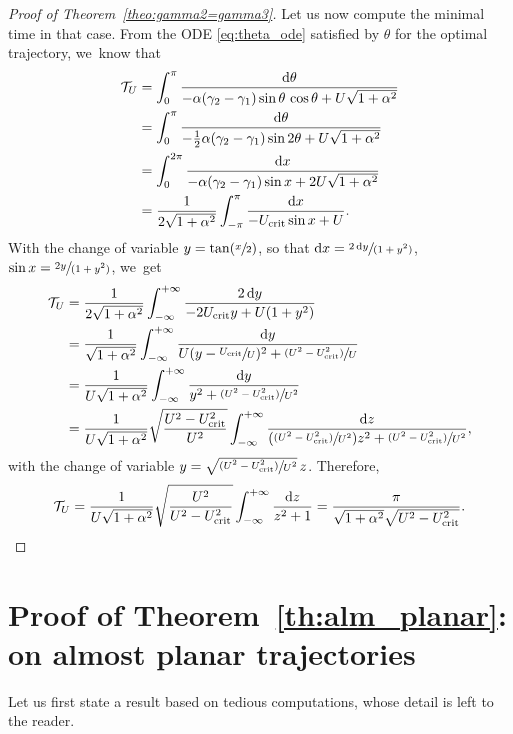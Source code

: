 \documentclass[10pt]{amsart}
\newcommand{\psfrac}[2]{\sfrac{(#1)}{#2}}
\newcommand{\spfrac}[2]{\sfrac{#1}{(#2)}}
\newcommand{\Psfrac}[2]{(\sfrac{#1}{#2})}
\newcommand{\Ppsfrac}[2]{(\psfrac{#1}{#2})}
\theoremstyle{definition}
\newcommand*\diff{\mathop{}\!\mathrm{d}}
\begin{document}
\begin{proof}[Proof of Theorem~\ref{theo:gamma2=gamma3}]
Let us now compute the minimal time in that case. From the ODE \eqref{eq:theta_ode} satisfied by $\theta$ for the optimal trajectory, we~know that
\begin{align*}
\mathcal{T}_U &= \int_0^\pi \frac{\diff \theta}{- \alpha (\gamma_2 - \gamma_1) \sin{\theta} \, \cos{\theta} + U \sqrt{1 + \alpha^2}} \\
&= \int_0^\pi \frac{\diff \theta}{- \frac{1}{2} \alpha (\gamma_2 - \gamma_1) \sin{2 \theta} + U \sqrt{1 + \alpha^2}} \\
&= \int_0^{2 \pi} \frac{\diff x}{- \alpha (\gamma_2 - \gamma_1) \sin{x} + 2 U \sqrt{1 + \alpha^2}} \\
&= \frac{1}{2 \sqrt{1 + \alpha^2}} \int_{- \pi}^{\pi} \frac{\diff x}{- U_\textnormal{crit} \sin{x} + U}.
\end{align*}
With the change of variable $y = \tan \Psfrac{x}{2}$, so that $\diff x = \spfrac{2 \diff y}{1 + y^2}$, $\sin x = \spfrac{2 y}{1 + y^2}$, we~get
\begin{align*}
\mathcal{T}_U &= \frac{1}{2 \sqrt{1 + \alpha^2}} \int_{-\infty}^{+ \infty} \frac{2 \diff y}{- 2 U_\textnormal{crit} y + U (1 + y^2)} \\
&= \frac{1}{\sqrt{1 + \alpha^2}} \int_{-\infty}^{+ \infty} \frac{\diff y}{U(y - \sfrac{U_\textnormal{crit}}{U})^2 + \psfrac{U^2 - U_\textnormal{crit}^2}{U}} \\
&= \frac{1}{U \sqrt{1 + \alpha^2}} \int_{-\infty}^{+ \infty} \frac{\diff y}{y^2 + \psfrac{U^2 - U_\textnormal{crit}^2}{U^2}} \\
&= \frac{1}{U \sqrt{1 + \alpha^2}} \sqrt{\frac{U^2 - U_\textnormal{crit}^2}{U^2}} \int_{-\infty}^{+ \infty} \frac{\diff z}{\Ppsfrac{U^2 - U_\textnormal{crit}^2}{U^2} z^2 + \psfrac{U^2 - U_\textnormal{crit}^2}{U^2}},
\end{align*}
with the change of variable $y = \sqrt{\psfrac{U^2 - U_\textnormal{crit}^2}{U^2}}\, z$. Therefore,
\[
\mathcal{T}_U = \frac{1}{U \sqrt{1 + \alpha^2}} \sqrt{\frac{U^2}{U^2 - U_\textnormal{crit}^2}} \int_{-\infty}^{+ \infty} \frac{\diff z}{z^2 + 1} = \frac{\pi}{\sqrt{1 + \alpha^2} \sqrt{U^2 - U_\textnormal{crit}^2}}. \qedhere
\]
\end{proof}

\section{Proof of Theorem~\ref{th:alm_planar}: on almost planar trajectories}\label{proof:theo8}

Let us first state a result based on tedious computations, whose detail is left to the reader.
\end{document}
